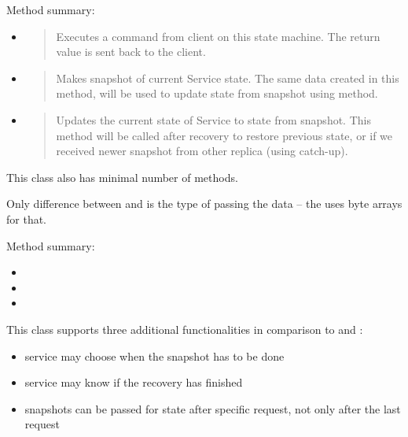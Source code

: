Method summary:
\begin{itemize}
\item {} 
\begin{quote}

Executes a command from client on this state machine. The return value is sent back to the client.
\end{quote}

\item {} 
\begin{quote}

Makes snapshot of current Service state. The same data created in this method, will be used to update state from snapshot using  method.
\end{quote}

\item {} 
\begin{quote}

Updates the current state of Service to state from snapshot. This me\-thod will be called after recovery to restore previous state, or if we received newer snapshot from other replica (using catch-up).
\end{quote}

\end{itemize}


\label{api:simplifiedservice-class}
This class also has minimal number of methods.

Only difference between  and  is the type of passing the data -- the  uses byte arrays for that.

Method summary:
\begin{itemize}
\item {} 

\item {} 

\item {} 

\end{itemize}


\label{api:abstractservice-class}
This class supports three additional functionalities in comparison to  and :
\begin{itemize}
\item {} 
service may choose when the snapshot has to be done

\item {} 
service may know if the recovery has finished

\item {} 
snapshots can be passed for state after specific request, not only after the last request

\end{itemize}


